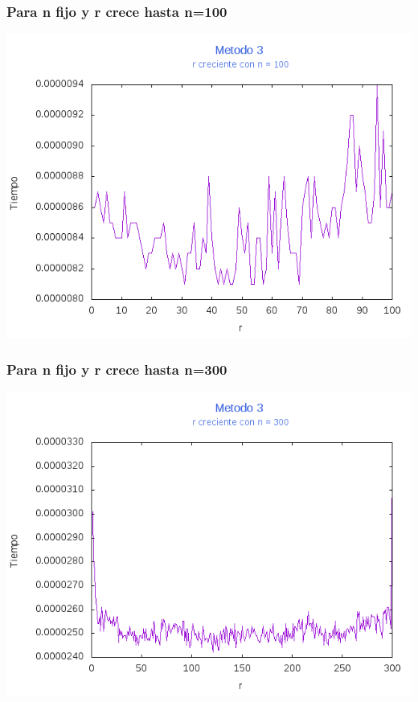 \documentclass[12pt,letterpaper]{scrartcl}
\begin{document}
\subsubsection{Para n fijo y r crece hasta n=100}
\includegraphics[scale=1]{Metodo3/plot100m3}

\subsubsection{Para n fijo y r crece hasta n=300}
\includegraphics[scale=1]{Metodo3/plot300m3}
\end{document}
